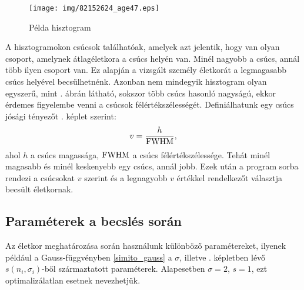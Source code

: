 \documentclass[12pt]{article}
\begin{document}
\begin{figure}[H]
	\centering
	\texttt{[image: img/82152624\_age47.eps]}
	\caption{Példa hisztogram} %
	\label{hisztogram_pelda}
\end{figure}
A hisztogramokon csúcsok találhatóak, amelyek azt jelentik, hogy van olyan csoport, amelynek átlagéletkora a csúcs helyén van. Minél nagyobb a csúcs, annál több ilyen csoport van. Ez alapján a vizsgált személy életkorát a legmagasabb csúcs helyével becsülhetnénk. Azonban nem mindegyik hisztogram olyan egyszerű, mint . ábrán látható, sokszor több csúcs hasonló nagyságú, ekkor érdemes figyelembe venni a csúcsok félértékszélességét. Definiálhatunk egy csúcs jósági tényezőt . képlet szerint:
\begin{equation} \label{csucs_josag}
	v = \frac{h}{\textnormal{FWHM}},
\end{equation}
ahol $h$ a csúcs magassága, $\textnormal{FWHM}$ a csúcs félértékszélessége. Tehát minél magasabb és minél keskenyebb egy csúcs, annál jobb. Ezek után a program sorba rendezi a csúcsokat $v$ szerint és a legnagyobb $v$ értékkel rendelkezőt választja becsült életkornak.

\subsection{Paraméterek a becslés során}
Az életkor meghatározása során használunk különböző paramétereket, ilyenek például a Gauss-függvényben \eqref{simito_gauss} a $\sigma$\iffalse TODO: na jó nem biztos, hogy így szép \fi, illetve . képletben lévő $s(n_i, \sigma_i)$-ből származtatott paraméterek. Alapesetben $\sigma = 2$, $s = 1$, ezt optimalizálatlan esetnek nevezhetjük.
\end{document}
